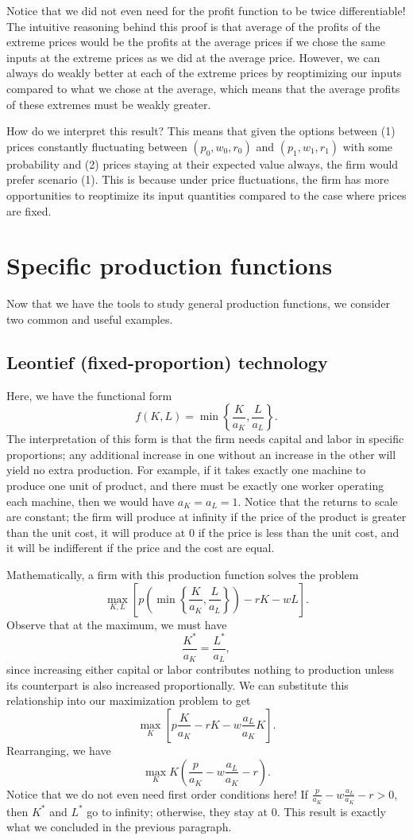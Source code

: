 Notice that we did not even need for the profit function to be twice differentiable! The intuitive reasoning behind this proof is that average of the profits of the extreme prices would be the profits at the average prices if we chose the same inputs at the extreme prices as we did at the average price. However, we can always do weakly better at each of the extreme prices by reoptimizing our inputs compared to what we chose at the average, which means that the average profits of these extremes must be weakly greater.

How do we interpret this result? This means that given the options between (1) prices constantly fluctuating between $(p_0, w_0, r_0)$ and $(p_1, w_1, r_1)$ with some probability and (2) prices staying at their expected value always, the firm would prefer scenario (1). This is because under price fluctuations, the firm has more opportunities to reoptimize its input quantities compared to the case where prices are fixed.

\section{Specific production functions}
Now that we have the tools to study general production functions, we consider two common and useful examples.


\subsection*{Leontief (fixed-proportion) technology}

Here, we have the functional form
$$f(K, L)=\min \left\{\frac{K}{a_{K}}, \frac{L}{a_{L}}\right\}.$$
The interpretation of this form is that the firm needs capital and labor in specific proportions; any additional increase in one without an increase in the other will yield no extra production. For example, if it takes exactly one machine to produce one unit of product, and there must be exactly one worker operating each machine, then we would have $a_K = a_L = 1$. Notice that the returns to scale are constant; the firm will produce at infinity if the price of the product is greater than the unit cost, it will produce at 0 if the price is less than the unit cost, and it will be indifferent if the price and the cost are equal.

Mathematically, a firm with this production function solves the problem
$$\max_{K, L} \left[p\left(\min\left\{\frac{K}{a_K}, \frac{L}{a_L}\right\}\right) - rK - wL\right].$$
Observe that at the maximum, we must have
$$\frac{K^*}{a_K} = \frac{L^*}{a_L},$$
since increasing either capital or labor contributes nothing to production unless its counterpart is also increased proportionally. We can substitute this relationship into our maximization problem to get
$$\max_{K} \left[p\frac{K}{a_K} - rK - w\frac{a_L}{a_K}K\right].$$
Rearranging, we have 
$$\max_{K} K\left(\frac{p}{a_K} - w\frac{a_L}{a_K} - r\right).$$
Notice that we do not even need first order conditions here! If $\frac{p}{a_K} - w\frac{a_L}{a_K} - r > 0$, then $K^*$ and $L^*$ go to infinity; otherwise, they stay at 0. This result is exactly what we concluded in the previous paragraph.

